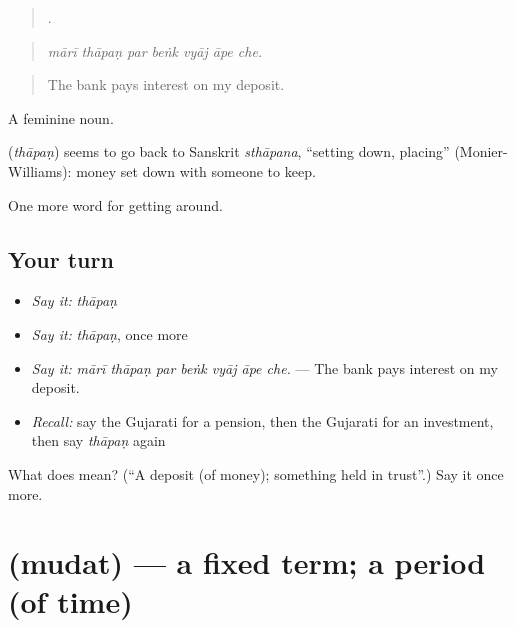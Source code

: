 \begin{quote}
      .
\end{quote}

\begin{quote}
\emph{mārī thāpaṇ par beṅk vyāj āpe che.}
\end{quote}

\begin{quote}
The bank pays interest on my deposit.
\end{quote}

A feminine noun.

\begin{cousinweb}
\textbf{} (\emph{thāpaṇ}) seems to go back to Sanskrit \emph{sthāpana}, \textquotedblleft{}setting down, placing\textquotedblright{} (Monier-Williams): money set down with someone to keep.
\end{cousinweb}

\begin{grammarlens}[title={What you've built}]
One more word for getting around.
\end{grammarlens}

\subsection*{Your turn}
\begin{itemize}
\raggedright
  \item \emph{Say it:} \emph{thāpaṇ}
  \item \emph{Say it:} \emph{thāpaṇ}, once more
  \item \emph{Say it:} \emph{mārī thāpaṇ par beṅk vyāj āpe che.} — The bank pays interest on my deposit.
  \item \emph{Recall:} say the Gujarati for a pension, then the Gujarati for an investment, then say \emph{thāpaṇ} again
\end{itemize}

\begin{tcolorbox}[breakable,colback=teal!4,colframe=teal!35!black,title={Before you move on}]
What does  mean? (\textquotedblleft{}A deposit (of money); something held in trust\textquotedblright{}.) Say it once more.
\end{tcolorbox}
\section[\texorpdfstring{\gu{મુદત} (mudat)}{મુદત (mudat)}]{ (mudat) — a fixed term; a period (of time)}

